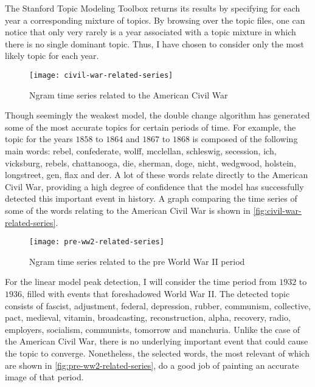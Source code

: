 
The Stanford Topic Modeling Toolbox returns its results by specifying for each year a corresponding mixture of topics. By browsing over the topic files, one can notice that only very rarely is a year associated with a topic mixture in which there is no single dominant topic. Thus, I have chosen to consider only the most likely topic for each year.

\begin{figure}
\centering
\texttt{[image: civil-war-related-series]}
\caption{Ngram time series related to the American Civil War}
\label{fig:civil-war-related-series}
\end{figure}

Though seemingly the weakest model, the double change algorithm has generated some of the most accurate topics for certain periods of time. For example, the topic for the years $1858$ to $1864$ and $1867$ to $1868$ is composed of the following main words: rebel, confederate, wolff, mcclellan, schleswig, secession, ich, vicksburg, rebels, chattanooga, die, sherman, doge, nicht, wedgwood, holstein, longstreet, gen, flax and der. A lot of these words relate directly to the American Civil War, providing a high degree of confidence that the model has successfully detected this important event in history. A graph comparing the time series of some of the words relating to the American Civil War is shown in \autoref{fig:civil-war-related-series}.

\begin{figure}
\centering
\texttt{[image: pre-ww2-related-series]}
\caption{Ngram time series related to the pre World War II period}
\label{fig:pre-ww2-related-series}
\end{figure}

For the linear model peak detection, I will consider the time period from $1932$ to $1936$, filled with events that foreshadowed World War II. The detected topic consists of fascist, adjustment, federal, depression, rubber, communism, collective, pact, medieval, vitamin, broadcasting, reconstruction, alpha, recovery, radio, employers, socialism, communists, tomorrow and manchuria. Unlike the case of the American Civil War, there is no underlying important event that could cause the topic to converge. Nonetheless, the selected words, the most relevant of which are shown in \autoref{fig:pre-ww2-related-series}, do a good job of painting an accurate image of that period.

